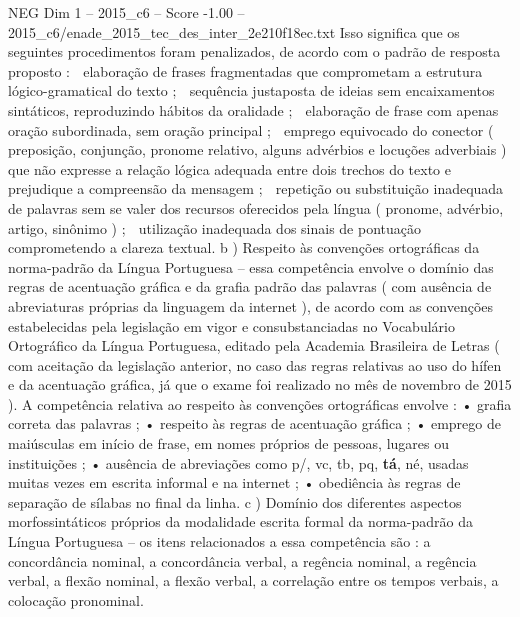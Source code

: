 \begin{textsample}{NEG Dim 1 – 2015\_c6 – Score -1.00 – 2015\_c6/enade\_2015\_tec\_des\_inter\_2e210f18ec.txt}
Isso significa que os seguintes procedimentos foram penalizados, de acordo com o padrão de resposta proposto :  elaboração de frases fragmentadas que comprometam a estrutura lógico-gramatical do texto ;  sequência justaposta de ideias sem encaixamentos sintáticos, reproduzindo hábitos da oralidade ;  elaboração de frase com apenas oração subordinada, sem oração principal ;  emprego equivocado do conector ( preposição, conjunção, pronome relativo, alguns advérbios e locuções adverbiais ) que não expresse a relação lógica adequada entre dois trechos do texto e prejudique a compreensão da mensagem ;  repetição ou substituição inadequada de palavras sem se valer dos recursos oferecidos pela língua ( pronome, advérbio, artigo, sinônimo ) ;  utilização inadequada dos sinais de pontuação comprometendo a clareza textual. b ) Respeito às convenções ortográficas da norma-padrão da Língua Portuguesa – essa competência envolve o domínio das regras de acentuação gráfica e da grafia padrão das palavras ( com ausência de abreviaturas próprias da linguagem da internet ), de acordo com as convenções estabelecidas pela legislação em vigor e consubstanciadas no Vocabulário Ortográfico da Língua Portuguesa, editado pela Academia Brasileira de Letras ( com aceitação da legislação anterior, no caso das regras relativas ao uso do hífen e da acentuação gráfica, já que o exame foi realizado no mês de novembro de 2015 ).
A competência relativa ao respeito às convenções ortográficas envolve : • grafia correta das palavras ; • respeito às regras de acentuação gráfica ; • emprego de maiúsculas em início de frase, em nomes próprios de pessoas, lugares ou instituições ; • ausência de abreviações como p/, vc, tb, pq, \textbf{tá}, né, usadas muitas vezes em escrita informal e na internet ; • obediência às regras de separação de sílabas no final da linha. c ) Domínio dos diferentes aspectos morfossintáticos próprios da modalidade escrita formal da norma-padrão da Língua Portuguesa – os itens relacionados a essa competência são : a concordância nominal, a concordância verbal, a regência nominal, a regência verbal, a flexão nominal, a flexão verbal, a correlação entre os tempos verbais, a colocação pronominal.

\end{textsample}

